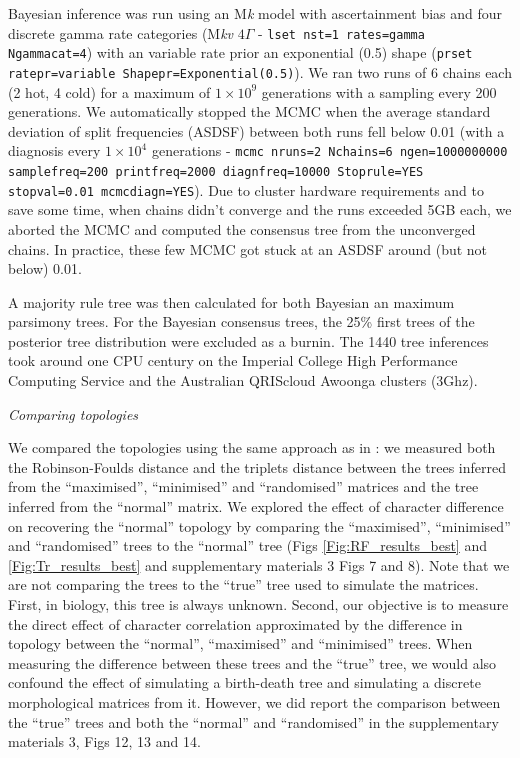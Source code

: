 \documentclass[12pt,letterpaper]{article}
\renewcommand{\subsection}[1]{%
\bigskip
\begin{center}
\begin{large}
\normalfont\itshape #1
\end{large}
\end{center}}
\begin{document}
Bayesian inference was run using an M\textit{k} model with ascertainment bias and four discrete gamma rate categories (M\textit{kv} $4\Gamma$ - \texttt{lset nst=1 rates=gamma Ngammacat=4}) with an variable rate prior an exponential (0.5) shape (\texttt{prset ratepr=variable Shapepr=Exponential(0.5)}).
We ran two runs of 6 chains each (2 hot, 4 cold) for a maximum of $1\times10^9$ generations with a sampling every 200 generations.
We automatically stopped the MCMC when the average standard deviation of split frequencies (ASDSF) between both runs fell below 0.01 (with a diagnosis every $1\times10^4$ generations - \texttt{mcmc nruns=2 Nchains=6 ngen=1000000000 samplefreq=200 printfreq=2000 diagnfreq=10000 Stoprule=YES stopval=0.01 mcmcdiagn=YES}).
Due to cluster hardware requirements and to save some time, when chains didn't converge and the runs exceeded 5GB each, we aborted the MCMC and computed the consensus tree from the unconverged chains.
In practice, these few MCMC got stuck at an ASDSF around (but not below) 0.01.

A majority rule tree was then calculated for both Bayesian an maximum parsimony trees.
For the Bayesian consensus trees, the 25\% first trees of the posterior tree distribution were excluded as a burnin.
The 1440 tree inferences took around one CPU century on the Imperial College High Performance Computing Service \citep[2-3GHz clock rate;][]{HPC} and the Australian QRIScloud Awoonga clusters (3Ghz).

\subsection{Comparing topologies}
We compared the topologies using the same approach as in \cite{Guillerme2016146}: we measured both the Robinson-Foulds distance \citep{RF1981} and the triplets distance \citep{dobson1975triplets} between the trees inferred from the ``maximised'', ``minimised'' and ``randomised'' matrices and the tree inferred from the ``normal'' matrix.
We explored the effect of character difference on recovering the ``normal'' topology by comparing the ``maximised'', ``minimised'' and ``randomised'' trees to the ``normal'' tree (Figs \ref{Fig:RF_results_best} and \ref{Fig:Tr_results_best} and supplementary materials 3 Figs 7 and 8).
Note that we are not comparing the trees to the ``true'' tree used to simulate the matrices.
First, in biology, this tree is always unknown.
Second, our objective is to measure the direct effect of character correlation approximated by the difference in topology between the ``normal'', ``maximised'' and ``minimised'' trees.
When measuring the difference between these trees and the ``true'' tree, we would also confound the effect of simulating a birth-death tree and simulating a discrete morphological matrices from it.
However, we did report the comparison between the ``true'' trees and both the ``normal'' and ``randomised'' in the supplementary materials 3, Figs 12, 13 and 14.
\end{document}
